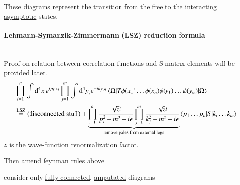 These diagrams represent the transition from the \underline{free} to the \underline{interacting asymptotic} states.

\paragraph{Lehmann-Symanzik-Zimmermann (LSZ) reduction formula} \hspace{0pt} \\
Proof on relation between correlation functions and S-matrix elements will be provided later.
\begin{align}
	\begin{split}
	&\prod_{i=1}^n \int \dd^4 x_i e^{ip_i \cdot x_i} \prod_{j=1}^{m} \int\dd^4 y_j e^{-i k_j \cdot y_i} \braket{\Omega | T\phi(x_1)\dots\phi(x_n)\phi(y_1)\dots\phi(y_m)|\Omega} \\
	&\stackrel{\text{LSZ}}{=} (\text{disconnected stuff}) + \underbrace{\prod_{i=1}^n \frac{\sqrt{z}i}{p_i^2 - m^2 +i\epsilon} \prod_{j=1}^m \frac{\sqrt{z}i}{k_j^2 - m^2 + i\epsilon}}_{\text{remove poles from external legs}} \braket{p_1\dots p_n| S | k_i\dots k_m}
	\end{split}
\end{align}
$z$ is the wave-function renormalization factor.

Then amend feynman rules above
\begin{center}
	consider only \underline{fully connected}, \underline{amputated} diagrams
\end{center}

